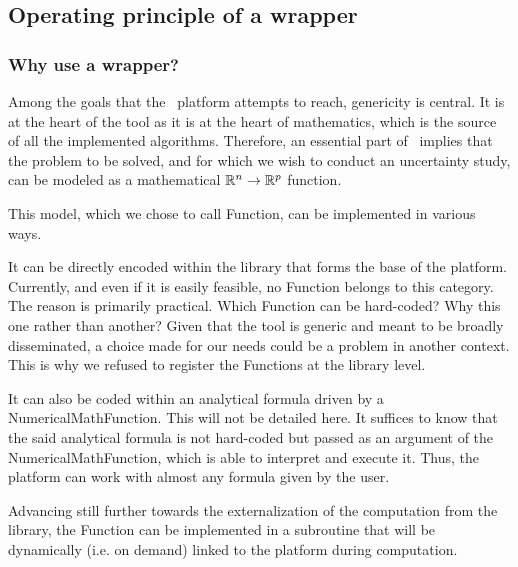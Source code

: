 
\subsection{Operating principle of a wrapper}

\subsubsection{Why use a wrapper?}

Among the goals that the \OT\ platform attempts to reach, genericity is central. It is at the heart of the tool as it is at the heart of mathematics, which is the source of all the implemented algorithms. Therefore, an essential part of \OT\ implies that the problem to be solved, and for which we wish to conduct an uncertainty study, can be modeled as a mathematical $\mathbb{R}^{n} \to \mathbb{R}^{p}$ function.

This model, which we chose to call Function, can be implemented in various ways.

It can be directly encoded within the library that forms the base of the platform. Currently, and even if it is easily feasible, no Function belongs to this category. The reason is primarily practical. Which Function can be hard-coded? Why this one rather than another? Given that the tool is generic and meant to be broadly disseminated, a choice made for our needs could be a problem in another context. This is why we refused to register the Functions at the library level.

It can also be coded within an analytical formula driven by a NumericalMathFunction. This will not be detailed here. It suffices to know that the said analytical formula is not hard-coded but passed as an argument of the NumericalMathFunction, which is able to interpret and execute it. Thus, the platform can work with almost any formula given by the user.

Advancing still further towards the externalization of the computation from the library, the Function can be implemented in a subroutine that will be dynamically (i.e. on demand) linked to the platform during computation.

